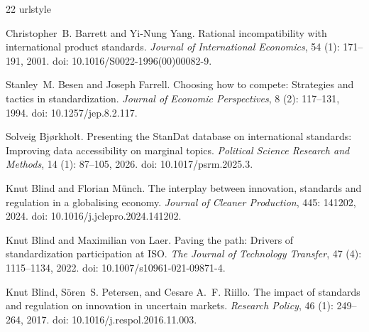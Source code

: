 \documentclass[sn-mathphys-ay]{sn-jnl}
\theoremstyle{plain}
\theoremstyle{remark}
\begin{document}
\begin{thebibliography}{22}
\providecommand{\natexlab}[1]{#1}
\providecommand{\url}[1]{\texttt{#1}}
\expandafter\ifx\csname urlstyle\endcsname\relax
  \providecommand{\doi}[1]{doi: #1}\else
  \providecommand{\doi}{doi: \begingroup \urlstyle{rm}\Url}\fi

Christopher~B. Barrett and Yi{-}Nung Yang.
\newblock Rational incompatibility with international product standards.
\newblock \emph{Journal of International Economics}, 54 (1):
  171--191, 2001.
\newblock \doi{10.1016/S0022-1996(00)00082-9}.

Stanley~M. Besen and Joseph Farrell.
\newblock Choosing how to compete: Strategies and tactics in standardization.
\newblock \emph{Journal of Economic Perspectives}, 8 (2):
  117--131, 1994.
\newblock \doi{10.1257/jep.8.2.117}.

Solveig Bj{\o}rkholt.
\newblock Presenting the {StanDat} database on international standards:
  Improving data accessibility on marginal topics.
\newblock \emph{Political Science Research and Methods}, 14
  (1): 87--105, 2026.
\newblock \doi{10.1017/psrm.2025.3}.

Knut Blind and Florian M{\"u}nch.
\newblock The interplay between innovation, standards and regulation in a
  globalising economy.
\newblock \emph{Journal of Cleaner Production}, 445: 141202, 2024.
\newblock \doi{10.1016/j.jclepro.2024.141202}.

Knut Blind and Maximilian von Laer.
\newblock Paving the path: Drivers of standardization participation at {ISO}.
\newblock \emph{The Journal of Technology Transfer}, 47 (4):
  1115--1134, 2022.
\newblock \doi{10.1007/s10961-021-09871-4}.

Knut Blind, S{\"o}ren~S. Petersen, and Cesare A.~F. Riillo.
\newblock The impact of standards and regulation on innovation in uncertain
  markets.
\newblock \emph{Research Policy}, 46 (1): 249--264, 2017.
\newblock \doi{10.1016/j.respol.2016.11.003}.


\end{thebibliography}
\end{document}
